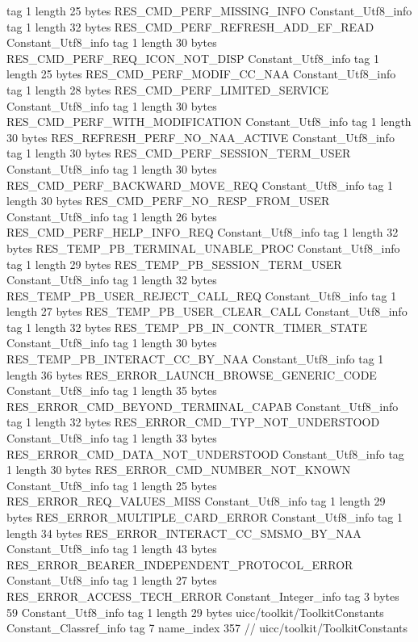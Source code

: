 {{{			tag	1
			length	25
			bytes	RES_CMD_PERF_MISSING_INFO
		}
		Constant_Utf8_info {
			tag	1
			length	32
			bytes	RES_CMD_PERF_REFRESH_ADD_EF_READ
		}
		Constant_Utf8_info {
			tag	1
			length	30
			bytes	RES_CMD_PERF_REQ_ICON_NOT_DISP
		}
		Constant_Utf8_info {
			tag	1
			length	25
			bytes	RES_CMD_PERF_MODIF_CC_NAA
		}
		Constant_Utf8_info {
			tag	1
			length	28
			bytes	RES_CMD_PERF_LIMITED_SERVICE
		}
		Constant_Utf8_info {
			tag	1
			length	30
			bytes	RES_CMD_PERF_WITH_MODIFICATION
		}
		Constant_Utf8_info {
			tag	1
			length	30
			bytes	RES_REFRESH_PERF_NO_NAA_ACTIVE
		}
		Constant_Utf8_info {
			tag	1
			length	30
			bytes	RES_CMD_PERF_SESSION_TERM_USER
		}
		Constant_Utf8_info {
			tag	1
			length	30
			bytes	RES_CMD_PERF_BACKWARD_MOVE_REQ
		}
		Constant_Utf8_info {
			tag	1
			length	30
			bytes	RES_CMD_PERF_NO_RESP_FROM_USER
		}
		Constant_Utf8_info {
			tag	1
			length	26
			bytes	RES_CMD_PERF_HELP_INFO_REQ
		}
		Constant_Utf8_info {
			tag	1
			length	32
			bytes	RES_TEMP_PB_TERMINAL_UNABLE_PROC
		}
		Constant_Utf8_info {
			tag	1
			length	29
			bytes	RES_TEMP_PB_SESSION_TERM_USER
		}
		Constant_Utf8_info {
			tag	1
			length	32
			bytes	RES_TEMP_PB_USER_REJECT_CALL_REQ
		}
		Constant_Utf8_info {
			tag	1
			length	27
			bytes	RES_TEMP_PB_USER_CLEAR_CALL
		}
		Constant_Utf8_info {
			tag	1
			length	32
			bytes	RES_TEMP_PB_IN_CONTR_TIMER_STATE
		}
		Constant_Utf8_info {
			tag	1
			length	30
			bytes	RES_TEMP_PB_INTERACT_CC_BY_NAA
		}
		Constant_Utf8_info {
			tag	1
			length	36
			bytes	RES_ERROR_LAUNCH_BROWSE_GENERIC_CODE
		}
		Constant_Utf8_info {
			tag	1
			length	35
			bytes	RES_ERROR_CMD_BEYOND_TERMINAL_CAPAB
		}
		Constant_Utf8_info {
			tag	1
			length	32
			bytes	RES_ERROR_CMD_TYP_NOT_UNDERSTOOD
		}
		Constant_Utf8_info {
			tag	1
			length	33
			bytes	RES_ERROR_CMD_DATA_NOT_UNDERSTOOD
		}
		Constant_Utf8_info {
			tag	1
			length	30
			bytes	RES_ERROR_CMD_NUMBER_NOT_KNOWN
		}
		Constant_Utf8_info {
			tag	1
			length	25
			bytes	RES_ERROR_REQ_VALUES_MISS
		}
		Constant_Utf8_info {
			tag	1
			length	29
			bytes	RES_ERROR_MULTIPLE_CARD_ERROR
		}
		Constant_Utf8_info {
			tag	1
			length	34
			bytes	RES_ERROR_INTERACT_CC_SMSMO_BY_NAA
		}
		Constant_Utf8_info {
			tag	1
			length	43
			bytes	RES_ERROR_BEARER_INDEPENDENT_PROTOCOL_ERROR
		}
		Constant_Utf8_info {
			tag	1
			length	27
			bytes	RES_ERROR_ACCESS_TECH_ERROR
		}
		Constant_Integer_info {
			tag	3
			bytes	59
		}
		Constant_Utf8_info {
			tag	1
			length	29
			bytes	uicc/toolkit/ToolkitConstants
		}
		Constant_Classref_info {
			tag	7
			name_index	357		// uicc/toolkit/ToolkitConstants
}}}
